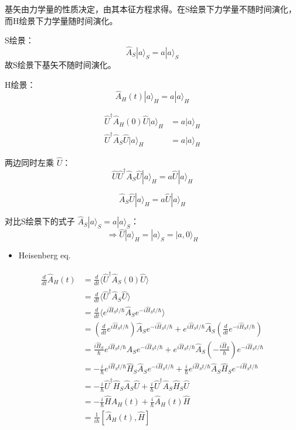 \documentclass[lang=cn,10pt]{elegantbook}
\begin{document}
基矢由力学量的性质决定，由其本征方程求得。在S绘景下力学量不随时间演化，而H绘景下力学量随时间演化。

S绘景：
\[ \hat{A}_S |a\rangle_S = a |a\rangle_S \]
故S绘景下基矢不随时间演化。

H绘景：
\[ \hat{A}_H(t) |a\rangle_H = a |a\rangle_H \]

\begin{align*}
	\hat{U}^\dagger \hat{A}_H(0) \hat{U} |a\rangle_H &= a |a\rangle_H \\
	\hat{U}^\dagger \hat{A}_S \hat{U} |a\rangle_H &= a |a\rangle_H
\end{align*}

两边同时左乘 \(\hat{U}\)：
\[ \hat{U} \hat{U}^\dagger \hat{A}_S \hat{U} |a\rangle_H = a \hat{U} |a\rangle_H \]

\[ \hat{A}_S \hat{U} |a\rangle_H = a \hat{U} |a\rangle_H \]

对比S绘景下的式子 \(\hat{A}_S |a\rangle_S = a |a\rangle_S\)：
\[ \Rightarrow \hat{U} |a\rangle_H = |a\rangle_S = |a, 0\rangle_H \]

\begin{itemize}
	\item Heisenberg eq.
\end{itemize}

\begin{align*}
	\frac{d}{dt} \hat{A}_H(t) &= \frac{d}{dt} \langle \hat{U}^\dagger \hat{A}_S(0) \hat{U} \rangle \\
	&= \frac{d}{dt} \langle \hat{U}^\dagger \hat{A}_S \hat{U} \rangle \\
	&= \frac{d}{dt} \langle e^{i \hat{H}_S t / \hbar} \hat{A}_S e^{-i \hat{H}_S t / \hbar} \rangle \\
	&= \left( \frac{d}{dt} e^{i \hat{H}_S t / \hbar} \right) \hat{A}_S e^{-i \hat{H}_S t / \hbar} + e^{i \hat{H}_S t / \hbar} \hat{A}_S \left( \frac{d}{dt} e^{-i \hat{H}_S t / \hbar} \right) \\
	&= \frac{i \hat{H}_S}{\hbar} e^{i \hat{H}_S t / \hbar} \hat{A}_S e^{-i \hat{H}_S t / \hbar} + e^{i \hat{H}_S t / \hbar} \hat{A}_S \left( -\frac{i \hat{H}_S}{\hbar} \right) e^{-i \hat{H}_S t / \hbar} \\
	&= -\frac{i}{\hbar} e^{i \hat{H}_S t / \hbar} \hat{H}_S \hat{A}_S e^{-i \hat{H}_S t / \hbar} + \frac{i}{\hbar} e^{i \hat{H}_S t / \hbar} \hat{A}_S \hat{H}_S e^{-i \hat{H}_S t / \hbar} \\
	&= -\frac{i}{\hbar} \hat{U}^\dagger \hat{H}_S \hat{A}_S \hat{U} + \frac{i}{\hbar} \hat{U}^\dagger \hat{A}_S \hat{H}_S \hat{U} \\
	&= -\frac{i}{\hbar} \hat{H} \hat{A}_H(t) + \frac{i}{\hbar} \hat{A}_H(t) \hat{H} \\
	&= \frac{1}{i \hbar} [\hat{A}_H(t), \hat{H}]
\end{align*}
\end{document}
